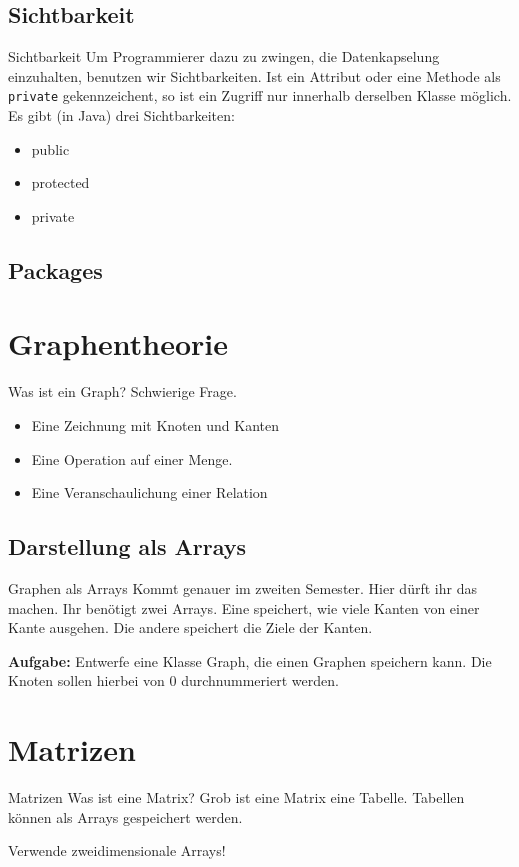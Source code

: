 \documentclass[18pt]{beamer}
\begin{document}
\subsection{Sichtbarkeit}
\begin{frame}[fragile]{Sichtbarkeit}
 Um Programmierer dazu zu zwingen, die Datenkapselung einzuhalten,
 benutzen wir Sichtbarkeiten. Ist ein Attribut oder eine Methode als 
 \verb|private| gekennzeichent, so ist ein Zugriff nur innerhalb
 derselben Klasse möglich.
 Es gibt (in Java) drei Sichtbarkeiten:
 \begin{itemize}
  \item public
  \item protected
  \item private
 \end{itemize}
\end{frame}

\subsection{Packages}
\section{Graphentheorie}
\begin{frame}{Was ist ein Graph?}
 Schwierige Frage.
 \begin{itemize}
  \item Eine Zeichnung mit Knoten und Kanten 
  \item Eine Operation auf einer Menge. 
  \item Eine Veranschaulichung einer Relation 
 \end{itemize}
\end{frame}

\subsection{Darstellung als Arrays}
\begin{frame}{Graphen als Arrays}
Kommt genauer im zweiten Semester. Hier dürft ihr das machen.
Ihr benötigt zwei Arrays. Eine speichert, wie viele Kanten von einer
Kante ausgehen. Die andere speichert die Ziele der Kanten.

\textbf{Aufgabe:} Entwerfe eine Klasse Graph, die einen Graphen speichern
kann. Die Knoten sollen hierbei von 0 durchnummeriert werden.
\end{frame}

\section{Matrizen}
\begin{frame}{Matrizen}
 Was ist eine Matrix?
 Grob ist eine Matrix eine Tabelle. 
 Tabellen können als Arrays gespeichert werden. 

 Verwende zweidimensionale Arrays!
\end{frame}
\end{document}
